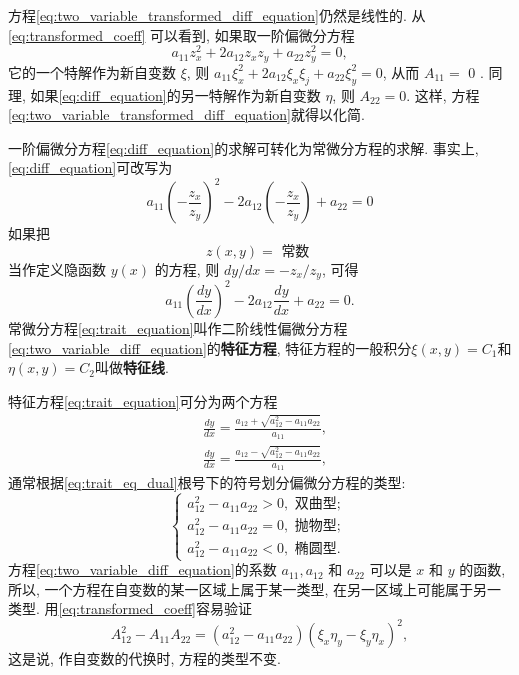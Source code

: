 方程\eqref{eq:two_variable_transformed_diff_equation}仍然是线性的.
从\eqref{eq:transformed_coeff} 可以看到, 如果取一阶偏微分方程
\begin{equation}
    a_{11} z_x^2+2 a_{12} z_x z_y+a_{22} z_y^2=0, 
    \label{eq:diff_equation}
\end{equation}
它的一个特解作为新自变数 $\xi$, 则 $a_{11} \xi_x^2+2 a_{12} \xi_x \xi_j+a_{22} \xi_y^2=0$, 
从而 $A_{11}=$ 0 . 同理, 如果\eqref{eq:diff_equation}的另一特解作为新自变数 $\eta$, 则 $A_{22}=0$. 
这样, 方程\eqref{eq:two_variable_transformed_diff_equation}就得以化简.

一阶偏微分方程\eqref{eq:diff_equation}的求解可转化为常微分方程的求解. 事实上, \eqref{eq:diff_equation}可改写为
\begin{equation}
    a_{11}\left(-\frac{z_x}{z_y}\right)^2-2 a_{12}\left(-\frac{z_x}{z_y}\right)+a_{22}=0
\end{equation}
如果把
$$
z(x, y)=\text { 常数 }
$$
当作定义隐函数 $y(x)$ 的方程, 则 $d y / d x=-z_x / z_y$, 可得
\begin{equation}
    a_{11}\left(\frac{d y}{d x}\right)^2-2 a_{12} 
\frac{d y}{d x}+a_{22}=0 .
\label{eq:trait_equation}
\end{equation}
常微分方程\eqref{eq:trait_equation}叫作二阶线性偏微分方程\eqref{eq:two_variable_diff_equation}的\textbf{特征方程}, 
特征方程的一般积分$\xi(x, y)= C_1$和$\eta(x, y)=C_2$叫做\textbf{特征线}.

特征方程\eqref{eq:trait_equation}可分为两个方程
\begin{equation}
    \begin{aligned}
        & \frac{d y}{d x}=\frac{a_{12}+\sqrt{a_{12}^2-a_{11} a_{22}}}{a_{11}}, \\
        & \frac{d y}{d x}=\frac{a_{12}-\sqrt{a_{12}^2-a_{11} a_{22}}}{a_{11}},
        \end{aligned}
    \label{eq:trait_eq_dual}
\end{equation}
通常根据\eqref{eq:trait_eq_dual}根号下的符号划分偏微分方程的类型:
$$
\left\{\begin{array}{l}
a_{12}^2-a_{11} a_{22}>0, \textbf { 双曲型; } \\
a_{12}^2-a_{11} a_{22}=0, \textbf { 抛物型; } \\
a_{12}^2-a_{11} a_{22}<0, \textbf { 椭圆型. }
\end{array}\right.
$$
方程\eqref{eq:two_variable_diff_equation}的系数 $a_{11}, a_{12}$ 和 $a_{22}$ 可以是 $x$ 和 $y$ 的函数,
 所以, 一个方程在自变数的某一区域上属于某一类型, 在另一区域上可能属于另一类型. 
 用\eqref{eq:transformed_coeff}容易验证
\begin{equation}
    A_{12}^2-A_{11} A_{22}=\left(a_{12}^2-a_{11} a_{22}\right)\left(\xi_x \eta_y-\xi_y \eta_x\right)^2,
\end{equation}
这是说, 作自变数的代换时, 方程的类型不变.


